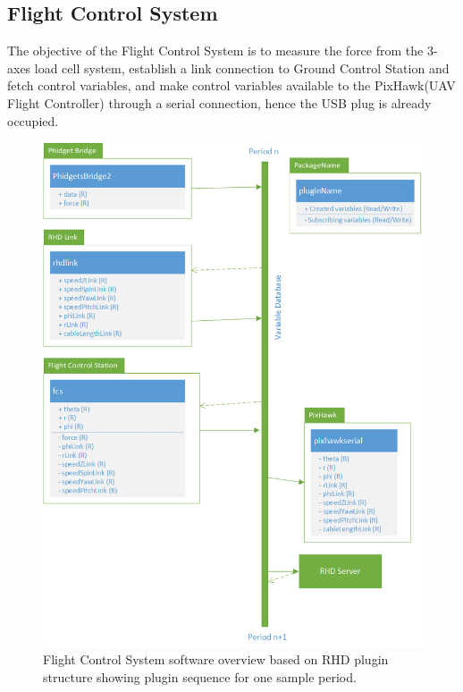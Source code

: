 \subsection{Flight Control System}
The objective of the Flight Control System is to measure the force from the 3-axes load cell system, establish a link connection to Ground Control Station and fetch control variables, and make control variables available to the PixHawk(UAV Flight Controller) through a serial connection, hence the USB plug is already occupied.


\begin{figure}[hbtp]
\centering
\includegraphics[scale=0.8]{graphics/Visio/FCS-software-overview.png}
\caption[Flight Control System software overview]{Flight Control System software overview based on RHD plugin structure showing plugin sequence for one sample period.}
\end{figure}
